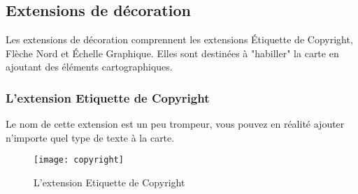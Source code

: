 
\subsection{Extensions de décoration}


Les extensions de décoration comprennent les extensions Étiquette de Copyright, 
Flèche Nord et Échelle Graphique. Elles sont destinées à "habiller" la carte en
ajoutant des éléments cartographiques.

\subsubsection{L'extension Etiquette de Copyright}

Le nom de cette extension est un peu trompeur, vous pouvez en réalité ajouter
n'importe quel type de texte à la carte.

\begin{figure}[ht]
   \begin{center}
   \caption{L'extension Etiquette de Copyright \nixcaption}\label{fig:copyright}\smallskip
   \texttt{[image: copyright]}
\end{center}  
\end{figure}

